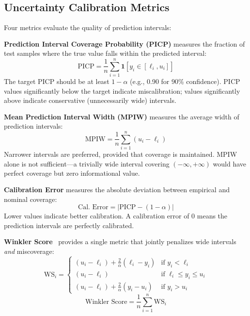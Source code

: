 \subsection{Uncertainty Calibration Metrics}
\label{subsec:calibration_metrics}

Four metrics evaluate the quality of prediction intervals:

\textbf{Prediction Interval Coverage Probability (PICP)} measures the fraction of test samples where the true value falls within the predicted interval:
\begin{equation}
    \text{PICP} = \frac{1}{n}\sum_{i=1}^{n} \mathbf{1}\!\left[y_i \in [\ell_i, u_i]\right]
    \label{eq:picp}
\end{equation}
The target PICP should be at least $1-\alpha$ (e.g., 0.90 for 90\% confidence). PICP values significantly below the target indicate miscalibration; values significantly above indicate conservative (unnecessarily wide) intervals.

\textbf{Mean Prediction Interval Width (MPIW)} measures the average width of prediction intervals:
\begin{equation}
    \text{MPIW} = \frac{1}{n}\sum_{i=1}^{n} (u_i - \ell_i)
    \label{eq:mpiw}
\end{equation}
Narrower intervals are preferred, provided that coverage is maintained. MPIW alone is not sufficient—a trivially wide interval covering $(-\infty, +\infty)$ would have perfect coverage but zero informational value.

\textbf{Calibration Error} measures the absolute deviation between empirical and nominal coverage:
\begin{equation}
    \text{Cal.\ Error} = |\text{PICP} - (1-\alpha)|
    \label{eq:cal_error}
\end{equation}
Lower values indicate better calibration. A calibration error of 0 means the prediction intervals are perfectly calibrated.

\textbf{Winkler Score}~\cite{winkler1972scoring} provides a single metric that jointly penalizes wide intervals \emph{and} miscoverage:
\begin{equation}
    \text{WS}_i =
    \begin{cases}
        (u_i - \ell_i) + \frac{2}{\alpha}(\ell_i - y_i) & \text{if } y_i < \ell_i \\[4pt]
        (u_i - \ell_i) & \text{if } \ell_i \leq y_i \leq u_i \\[4pt]
        (u_i - \ell_i) + \frac{2}{\alpha}(y_i - u_i) & \text{if } y_i > u_i
    \end{cases}
    \label{eq:winkler}
\end{equation}
\begin{equation}
    \text{Winkler Score} = \frac{1}{n}\sum_{i=1}^{n} \text{WS}_i
    \label{eq:winkler_mean}
\end{equation}

